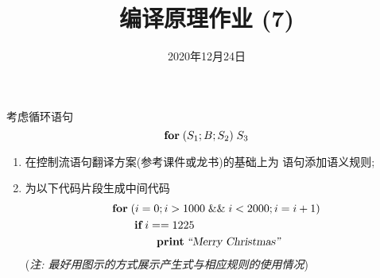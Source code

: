 \documentclass[a4paper, justified]{tufte-handout}
\title{编译原理作业 (7)}
\date{2020年12月24日}
\begin{document}
\maketitle
\noplagiarism %
\begin{abstract}
\end{abstract}
\beginrequired

\begin{problem}[\score{10 = 5 + 5}]
  考虑循环语句
  \[
    \text{\bf for} \;(S_{1}; B; S_{2})\; S_{3}
  \]
  \begin{enumerate}[(1)]
    \item 在控制流语句翻译方案(参考课件或龙书)的基础上为 \forkw{} 语句添加语义规则;
    \item 为以下代码片段生成中间代码
      \begin{align*}
        &\text{\bf for}\; (i = 0; i > 1000 \;\&\&\; i < 2000; i = i + 1) \\
          &\qquad \text{\bf if}\; i == 1225\; \\
          &\qquad\qquad \text{\bf print}\; {\textsl{``Merry Christmas''}}
      \end{align*}
      ({\it 注: 最好用图示的方式展示产生式与相应规则的使用情况})
  \end{enumerate}
\end{problem}
\end{document}
